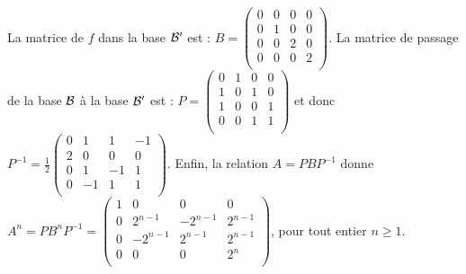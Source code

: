 {\begin{question}
\begin{explanations}
\vskip0mm
La matrice de $f$ dans la base ${\cal B}'$ est :
$B= \left(\begin{array}{rccc}
0&0&0&0\\
0&1&0&0\\
0&0&2&0\\
0&0&0&2\\
\end{array}\right)$. La matrice de passage de la base ${\cal B}$ à la base ${\cal B}'$ est :
$P= \left(\begin{array}{rccc}
0&1&0&0\\
1&0&1&0\\
1&0&0&1\\
0&0&1&1\\
\end{array}\right)$ et donc
$\displaystyle P^{-1}= \frac{1}{2}\left(\begin{array}{rccc}
0&1&1&-1\\
2&0&0&0\\
0&1&-1&1\\
0&-1&1&1\\
\end{array}\right).$
\vskip0mm
Enfin, la relation $A=PBP^{-1}$ donne
$A^n= PB^nP^{-1} = \left(\begin{array}{rccc}
1&0&0&0\\
0 &2^{n-1}&-2^{n-1}&2^{n-1}\\
0 &-2^{n-1}&2^{n-1}&2^{n-1}\\
0 &0&0&2^n\\
\end{array}\right)$, pour tout entier $n\ge1$.
\end{explanations}
\end{question}
}
